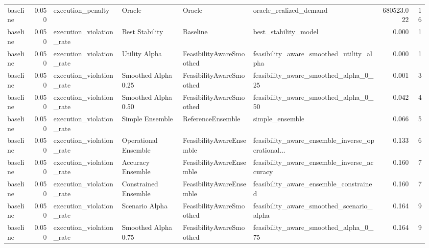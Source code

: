 \begin{table}
{\begin{tabular}{lrllllrr}
      baseline &             0.050 &           execution\_penalty &                Oracle &                    Oracle &                             oracle\_realized\_demand &    680523.022 &              16 \\
      baseline &             0.050 &    execution\_violation\_rate &        Best Stability &                  Baseline &                               best\_stability\_model &         0.000 &               1 \\
      baseline &             0.050 &    execution\_violation\_rate &         Utility Alpha &  FeasibilityAwareSmoothed &           feasibility\_aware\_smoothed\_utility\_alpha &         0.000 &               1 \\
      baseline &             0.050 &    execution\_violation\_rate &   Smoothed Alpha 0.25 &  FeasibilityAwareSmoothed &              feasibility\_aware\_smoothed\_alpha\_0\_25 &         0.001 &               3 \\
      baseline &             0.050 &    execution\_violation\_rate &   Smoothed Alpha 0.50 &  FeasibilityAwareSmoothed &              feasibility\_aware\_smoothed\_alpha\_0\_50 &         0.042 &               4 \\
      baseline &             0.050 &    execution\_violation\_rate &       Simple Ensemble &         ReferenceEnsemble &                                    simple\_ensemble &         0.066 &               5 \\
      baseline &             0.050 &    execution\_violation\_rate &  Operational Ensemble &  FeasibilityAwareEnsemble &  feasibility\_aware\_ensemble\_inverse\_operational... &         0.133 &               6 \\
      baseline &             0.050 &    execution\_violation\_rate &     Accuracy Ensemble &  FeasibilityAwareEnsemble &        feasibility\_aware\_ensemble\_inverse\_accuracy &         0.160 &               7 \\
      baseline &             0.050 &    execution\_violation\_rate &  Constrained Ensemble &  FeasibilityAwareEnsemble &             feasibility\_aware\_ensemble\_constrained &         0.160 &               7 \\
      baseline &             0.050 &    execution\_violation\_rate &        Scenario Alpha &  FeasibilityAwareSmoothed &          feasibility\_aware\_smoothed\_scenario\_alpha &         0.164 &               9 \\
      baseline &             0.050 &    execution\_violation\_rate &   Smoothed Alpha 0.75 &  FeasibilityAwareSmoothed &              feasibility\_aware\_smoothed\_alpha\_0\_75 &         0.164 &               9 \\

\end{tabular}}
\end{table}
